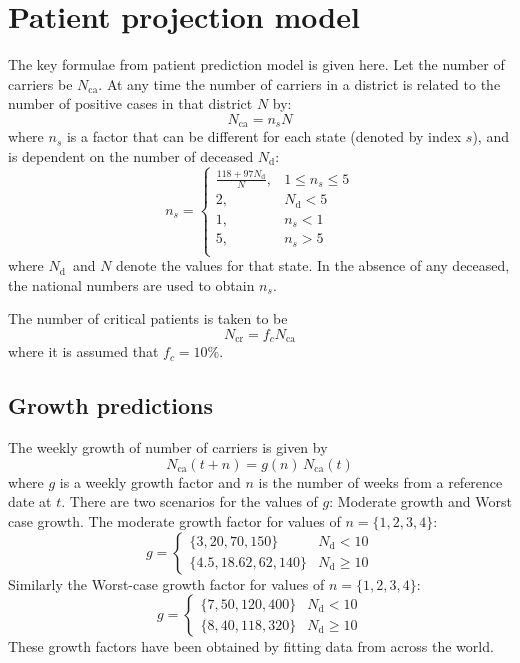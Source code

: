 \documentclass{article}
\newcommand{\nd}{\ensuremath{N_{\mathrm{d}}}}
\newcommand{\ncr}{\ensuremath{N_{\mathrm{cr}}}}
\newcommand{\nca}{\ensuremath{N_{\mathrm{ca}}}}
\begin{document}
\appendix
\section{Patient projection model}
The key formulae from patient prediction model \cite{ansualok20} is
given here. Let the number of carriers be \nca. At any time the number
of carriers in a district is related to the number
of positive cases in that district $N$ by:
\begin{equation}
  \label{eq:1}
  \nca = n_{s} N
\end{equation}
where $n_{s}$ is a factor that can be different for each state
(denoted by index $s$), and is dependent on the number of deceased
\nd:
\begin{equation}
  n_{s} =  \begin{cases}
    \frac{118 + 97 \nd}{N}, &  1 \leq n_{s} \leq 5\\
    2, & \nd < 5 \\
    1, & n_{s} < 1 \\
    5, & n_{s} > 5 \\
  \end{cases}
\end{equation}
where \nd\ and $N$ denote the values for that state. In
the absence of any deceased, the national numbers are used to obtain
$n_{s}$.

The number of critical patients is taken to be
\begin{equation}
  \ncr = f_{c} \nca
\end{equation}
where it is assumed that $f_{c} = 10\%$.

\subsection{Growth predictions}
The weekly growth of number of carriers is given by
\begin{equation}
  \nca(t+n) = g(n) \, \nca(t) 
\end{equation}
where $g$ is a weekly growth factor and $n$ is the number of weeks
from a reference date at $t$.  There are two scenarios for the values
of $g$: Moderate growth and Worst case growth.  The moderate growth
factor for values of $n = \{1, 2, 3, 4\}$:
\begin{equation}
  g = \begin{cases}
   \{3, 20, 70, 150\}  & \nd < 10 \\
   \{4.5, 18.62, 62, 140\} & \nd \geq 10
 \end{cases}
\end{equation}
Similarly the Worst-case growth factor for values of $n = \{1, 2, 3, 4\}$:
\begin{equation}
  g = \begin{cases}
   \{7, 50, 120, 400\}  & \nd < 10 \\
   \{8, 40, 118, 320\} & \nd \geq 10
 \end{cases}
\end{equation}
These growth factors have been obtained by fitting data from across
the world.





\end{document}
